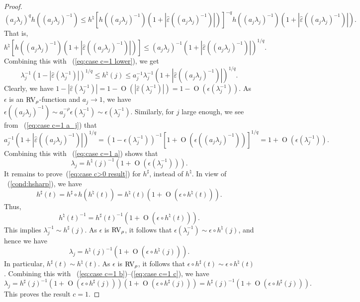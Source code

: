 \documentclass[10pt, a4paper]{amsart}
\newcommand{\op}{\operatorname}
\numberwithin{equation}{section}
\theoremstyle{definition}
\theoremstyle{remark}
\newcommand{\RV}{\textup{RV}}
\begin{document}
\begin{proof}
\begin{equation*}
(a_j\lambda_j)^qh((a_j\lambda_j)^{-1})\leq h^\natural[  h((a_j\lambda_j)^{-1})(1+|\hat{\varepsilon}((a_j\lambda_j)^{-1})|)]^{-q}h((a_j\lambda_j)^{-1})(1+|\hat{\varepsilon}((a_j\lambda_j)^{-1})|).
\end{equation*}
That is,
\begin{equation*}
h^\natural[  h((a_j\lambda_j)^{-1})(1+|\hat{\varepsilon}((a_j\lambda_j)^{-1})|)]\leq (a_j\lambda_j)^{-1}(1+|\hat{\varepsilon}((a_j\lambda_j)^{-1})|)^{1/q}.
\end{equation*}
Combining this with ~(\ref{eq:case c=1 lower}), we get
\begin{equation}\label{eq:case c=1 a}
\lambda_j^{-1}(1-|\hat{\varepsilon}(\lambda_j^{-1})|)^{1/q}\leq h^\natural(j)\leq a_j^{-1}\lambda_j^{-1}(1+|\hat{\varepsilon}((a_j\lambda_j)^{-1})|)^{1/q}.
\end{equation}
Clearly, we have $1-|\hat{\varepsilon}(\lambda_j^{-1})|=1-\op{O}(|\hat{\varepsilon}(\lambda_j^{-1})|)=1-\op{O}(\epsilon(\lambda_j^{-1}))$. As  $\epsilon$ is an $\RV_{\rho}$-function and $a_j\to1$, we have $ \epsilon((a_j\lambda_j)^{-1})\sim a_j^{-\rho}\epsilon(\lambda_j^{-1})\sim \epsilon(\lambda_j^{-1})$. Similarly, for $j$ large enough, we see from ~(\ref{eq:case c=1 a_j}) that
\begin{equation*}
a_j^{-1}(1+|\hat{\varepsilon}((a_j\lambda_j)^{-1})|)^{1/q}=(1-\epsilon(\lambda_j^{-1}))^{-1}[1+\op{O}(\epsilon((a_j\lambda_j)^{-1}))]^{1/q}=1+\op{O}(\epsilon(\lambda_j^{-1})).
\end{equation*}
Combining this with ~(\ref{eq:case c=1 a}) shows that
\begin{equation}\label{eq:case c=1 b}
\lambda_j=h^\natural(j)^{-1}(1+\op{O}(\epsilon(\lambda_j^{-1}))).
\end{equation}
It remains to prove~(\ref{eq:case c>0 result}) for $h^\sharp$, instead of $h^\natural$. In view of ~(\ref{cond:hsharp}), we have
\begin{equation*}
h^\sharp(t)=h^\sharp\circ h(h^\natural(t))=h^\natural(t)(1+\op{O}(\epsilon\circ h^\natural(t))).
\end{equation*}
Thus,
\begin{equation}\label{eq:case c=1 c}
h^{\natural}(t)^{-1}=h^\sharp(t)^{-1}(1+\op{O}(\epsilon\circ h^\natural(t))).
\end{equation}
This implies
$\lambda_j^{-1}\sim h^\sharp(j)$.
As $\epsilon$ is $\RV_\rho$, it follows that $\epsilon(\lambda_j^{-1})\sim \epsilon\circ h^\natural(j)$, and hence we have
\begin{equation*}
\lambda_j=h^\natural(j)^{-1}(1+\op{O}(\epsilon\circ h^\natural(j))).
\end{equation*}
In particular, $h^\sharp(t)\sim h^\natural(t)$. As $\epsilon$ is $\RV_\rho$, it follows that $\epsilon\circ h^\sharp(t)\sim \epsilon\circ h^\natural(t)$. Combining this with ~(\ref{eq:case c=1 b})--(\ref{eq:case c=1 c}), we have
\begin{equation*}
\lambda_j=h^\sharp(j)^{-1}(1+\op{O}(\epsilon\circ h^\sharp(j)))(1+\op{O}(\epsilon\circ h^\sharp(j)))=h^\sharp(j)^{-1}(1+\op{O}(\epsilon\circ h^\sharp(j))).
\end{equation*}
This proves the result $c=1$. 


\end{proof}
\end{document}
